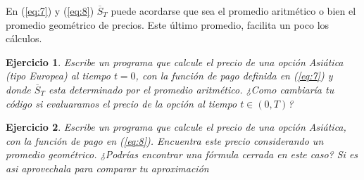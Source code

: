 \documentclass{article}
\newtheorem{ejercicio}{Ejercicio}
\begin{document}
En (\ref{eq:7}) y (\ref{eq:8}) $\overline{S}_T$ puede acordarse que sea el promedio aritmético o bien el promedio geométrico de precios. Este último promedio, facilita un poco los cálculos.
\begin{ejercicio}
    Escribe un programa que calcule el precio de una opción Asiática (tipo Europea) al tiempo $t= 0$, con la función de pago definida en (\ref{eq:7}) y donde $\overline{S}_T$ esta determinado por el promedio aritmético.
    ¿Como cambiaría tu código si evaluaramos el precio de la opción al tiempo $t \in (0,T)$?
\end{ejercicio}
\begin{ejercicio}
    Escribe un programa que calcule el precio de una opción Asiática, con la función de pago en (\ref{eq:8}). Encuentra este precio considerando un promedio geométrico. ¿Podrías encontrar una fórmula cerrada en este caso? Si es asi aprovechala para comparar tu aproximación 
    
\end{ejercicio}
\end{document}
